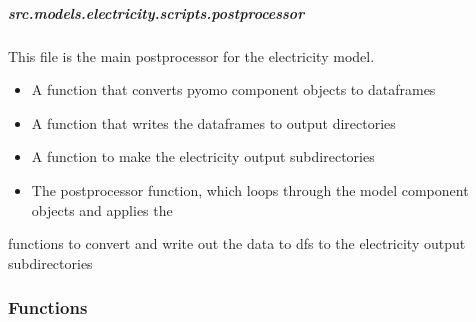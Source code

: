 \documentclass[letterpaper,10pt,english]{sphinxmanual}
\begin{document}
\subparagraph{src.models.electricity.scripts.postprocessor}
\label{\detokenize{src.models.electricity.scripts.postprocessor:module-src.models.electricity.scripts.postprocessor}}\label{\detokenize{src.models.electricity.scripts.postprocessor:src-models-electricity-scripts-postprocessor}}\label{\detokenize{src.models.electricity.scripts.postprocessor::doc}}
\sphinxAtStartPar
This file is the main postprocessor for the electricity model.
\begin{description}
\begin{itemize}
\item {} 
\sphinxAtStartPar
A function that converts pyomo component objects to dataframes

\item {} 
\sphinxAtStartPar
A function that writes the dataframes to output directories

\item {} 
\sphinxAtStartPar
A function to make the electricity output sub\sphinxhyphen{}directories

\item {} 
\sphinxAtStartPar
The postprocessor function, which loops through the model component objects and applies the

\end{itemize}

\sphinxAtStartPar
functions to convert and write out the data to dfs to the electricity output sub\sphinxhyphen{}directories

\end{description}
\subsubsection*{Functions}
\end{document}
